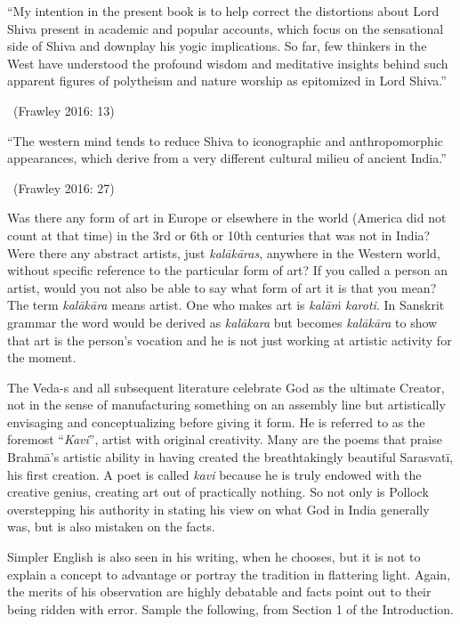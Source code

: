 \begin{myquote}
“My intention in the present book is to help correct the distortions about Lord Shiva present in academic and popular accounts, which focus on the sensational side of Shiva and downplay his yogic implications. So far, few thinkers in the West have understood the profound wisdom and meditative insights behind such apparent figures of polytheism and nature worship as epitomized in Lord Shiva.” 

~\hfill (Frawley 2016: 13)
\end{myquote}

\begin{myquote}
“The western mind tends to reduce Shiva to iconographic and anthropomorphic appearances, which derive from a very different cultural milieu of ancient India.” 

~\hfill (Frawley 2016: 27)
\end{myquote}

Was there any form of art in Europe or elsewhere in the world (America did not count at that time) in the 3rd or 6th or 10th centuries that was not in India? Were there any abstract artists, just \textit{kalākāras}, anywhere in the Western world, without specific reference to the particular form of art? If you called a person an artist, would you not also be able to say what form of art it is that you mean? The term \textit{kalākāra} means artist. One who makes art is \textit{kalāṁ karoti}. In Sanskrit grammar the word would be derived as \textit{kalākara} but becomes \textit{kalākāra} to show that art is the person’s vocation and he is not just working at artistic activity for the moment.

The Veda-s and all subsequent literature celebrate God as the ultimate Creator, not in the sense of manufacturing something on an assembly line but artistically envisaging and conceptualizing before giving it form. He is referred to as the foremost “\textit{Kavi}”, artist with original creativity. Many are the poems that praise Brahmā’s artistic ability in having created the breathtakingly beautiful Sarasvatī, his first creation. A poet is called \textit{kavi} because he is truly endowed with the creative genius, creating art out of practically nothing. So not only is Pollock overstepping his authority in stating his view on what God in India generally was, but is also mistaken on the facts.

\newpage

Simpler English is also seen in his writing, when he chooses, but it is not to explain a concept to advantage or portray the tradition in flattering light. Again, the merits of his observation are highly debatable and facts point out to their being ridden with error. Sample the following, from Section 1 of the Introduction.

